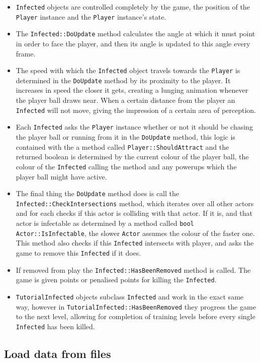 \begin{itemize}
	\item \verb!Infected! objects are controlled completely by the game, the position of the \verb!Player! instance and the \verb!Player! instance's state.
	\item The \verb!Infected::DoUpdate! method calculates the angle at which it must point in order to face the player, and then its angle is updated to this angle every frame.
	\item The speed with which the \verb!Infected! object travels towards the \verb!Player! is determined in the \verb!DoUpdate! method by its proximity to the player. It increases in speed the closer it gets, creating a lunging animation whenever the player ball draws near. When a certain distance from the player an \verb!Infected! will not move, giving the impression of a certain area of perception.
	\item Each \verb!Infected! asks the \verb!Player! instance whether or not it should be chasing the player ball or running from it in the \verb!DoUpdate! method, this logic is contained with the a method called \verb!Player::ShouldAttract! and the returned boolean is determined by the current colour of the player ball, the colour of the \verb!Infected! calling the method and any powerups which the player ball might have active.
	\item The final thing the \verb!DoUpdate! method does is call the \verb!Infected::CheckIntersections! method, which iterates over all other actors and for each checks if this actor is colliding with that actor. If it is, and that actor is infectable as determined by a method called \verb!bool Actor::IsInfectable!, the slower \verb!Actor! assumes the colour of the faster one. This method also checks if this \verb!Infected! intersects with player, and asks the game to remove this \verb!Infected! if it does.
	\item If removed from play the \verb!Infected::HasBeenRemoved! method is called. The game is given points or penalised points for killing the \verb!Infected!.
	\item \verb!TutorialInfected! objects subclass \verb!Infected! and work in the exact same way, however in \verb!TutorialInfected::HasBeenRemoved! they progress the game to the next level, allowing for completion of training levels before every single \verb!Infected! has been killed.
	
\end{itemize}

\subsection{Load data from files}

